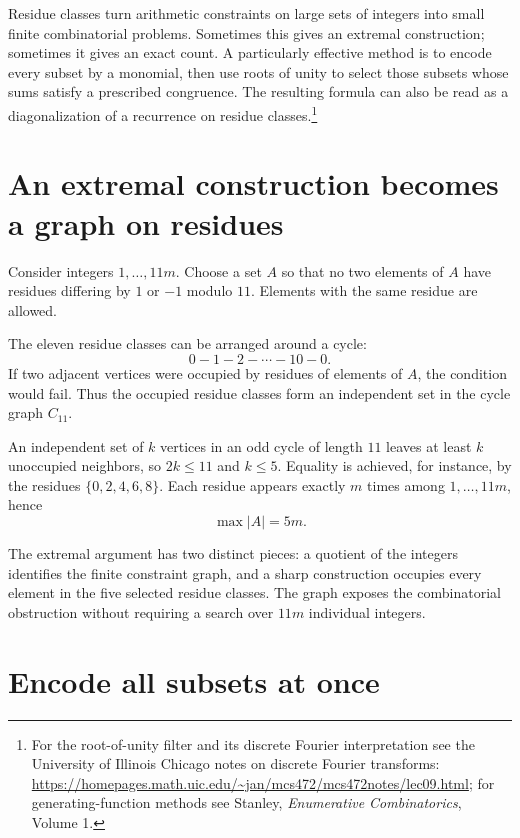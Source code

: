 
Residue classes turn arithmetic constraints on large sets of integers into small finite combinatorial problems. Sometimes this gives an extremal construction; sometimes it gives an exact count. A particularly effective method is to encode every subset by a monomial, then use roots of unity to select those subsets whose sums satisfy a prescribed congruence. The resulting formula can also be read as a diagonalization of a recurrence on residue classes.\footnote{For the root-of-unity filter and its discrete Fourier interpretation see the University of Illinois Chicago notes on discrete Fourier transforms: \url{https://homepages.math.uic.edu/~jan/mcs472/mcs472notes/lec09.html}; for generating-function methods see Stanley, \emph{Enumerative Combinatorics}, Volume 1.}

\section{An extremal construction becomes a graph on residues}

Consider integers \(1,\ldots,11m\). Choose a set \(A\) so that no two elements of \(A\) have residues differing by \(1\) or \(-1\) modulo \(11\). Elements with the same residue are allowed.

The eleven residue classes can be arranged around a cycle:
\[
 0\!-\!1\!-\!2\!-\!\cdots\!-\!10\!-\!0.
\]
If two adjacent vertices were occupied by residues of elements of \(A\), the condition would fail. Thus the occupied residue classes form an independent set in the cycle graph \(C_{11}\).

An independent set of \(k\) vertices in an odd cycle of length \(11\) leaves at least \(k\) unoccupied neighbors, so \(2k\le11\) and \(k\le5\). Equality is achieved, for instance, by the residues \(\{0,2,4,6,8\}\). Each residue appears exactly \(m\) times among \(1,\ldots,11m\), hence
\[
 \boxed{\max |A|=5m.}
\]

The extremal argument has two distinct pieces: a quotient of the integers identifies the finite constraint graph, and a sharp construction occupies every element in the five selected residue classes. The graph exposes the combinatorial obstruction without requiring a search over \(11m\) individual integers.

\section{Encode all subsets at once}

